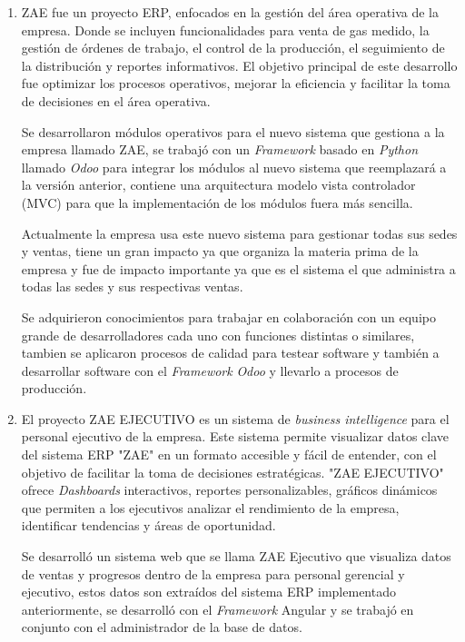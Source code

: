 \documentclass[protocolo.tex]{subfiles}
\begin{document}
\begin{enumerate}
\item ZAE fue un proyecto ERP,  enfocados  en  la  gestión  del  área  operativa  de  la  empresa.  Donde se  incluyen  funcionalidades  para  venta de gas medido, la gestión de órdenes de trabajo, el control de la producción, el seguimiento de la distribución y reportes informativos.  El  objetivo  principal  de  este  desarrollo  fue  optimizar  los  procesos  operativos,  mejorar  la  eficiencia  y  facilitar  la  toma  de  decisiones  en  el  área  operativa.


Se desarrollaron módulos operativos para el nuevo sistema que gestiona a la empresa llamado ZAE, se
trabajó con un \textit{Framework} basado en \textit{Python} llamado \textit{Odoo} para integrar los módulos al
nuevo sistema que reemplazará a la versión anterior, contiene una arquitectura modelo vista controlador (MVC) para
que la implementación de los módulos fuera más sencilla.


Actualmente la empresa usa este nuevo sistema para gestionar todas sus sedes y ventas,
tiene un gran impacto ya que organiza la materia prima de la empresa y fue de impacto
importante ya que es el sistema el que administra a todas las sedes y sus respectivas
ventas.

Se adquirieron conocimientos para trabajar en colaboración con un equipo grande de desarrolladores cada uno
con funciones distintas o similares, tambien se aplicaron procesos de calidad para testear software y
también a desarrollar software con el \textit{Framework} \textit{Odoo} y llevarlo a procesos de producción.


\item El proyecto ZAE EJECUTIVO es un sistema  de  \textit{business intelligence}  para  el  personal  ejecutivo  de  la  empresa.  Este  sistema  permite  visualizar  datos  clave  del  sistema  ERP  "ZAE"  en  un  formato  accesible  y  fácil  de  entender,  con  el  objetivo  de  facilitar  la  toma  de  decisiones  estratégicas.  "ZAE  EJECUTIVO"  ofrece \textit{Dashboards} interactivos, reportes personalizables, gráficos dinámicos que  permiten  a  los  ejecutivos  analizar  el  rendimiento  de  la  empresa,  identificar  tendencias  y  áreas  de  oportunidad.


Se desarrolló un sistema web que se llama ZAE Ejecutivo que visualiza datos de ventas y progresos dentro de la
empresa para personal gerencial y ejecutivo, estos datos son extraídos del sistema ERP
implementado anteriormente, se desarrolló con el \textit{Framework} Angular y se trabajó en
conjunto con el administrador de la base de datos.



\end{enumerate}
\end{document}
